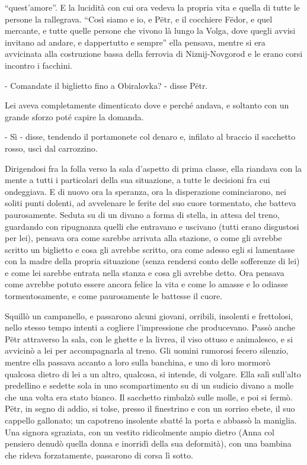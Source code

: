 ``quest'amore''. E la lucidità con cui ora vedeva la propria vita e quella di tutte le persone la rallegrava. ``Così siamo e io, e Pëtr, e il cocchiere Fëdor, e quel mercante, e tutte quelle persone che vivono là lungo la Volga, dove quegli avvisi invitano ad andare, e dappertutto e sempre'' ella pensava, mentre si era avvicinata alla costruzione bassa della ferrovia di Niznij-Novgorod e le erano corsi incontro i facchini. 

- Comandate il biglietto fino a Obiralovka? - disse Pëtr. 

Lei aveva completamente dimenticato dove e perché andava, e soltanto con un grande sforzo poté capire la domanda. 

- Sì - disse, tendendo il portamonete col denaro e, infilato al braccio il sacchetto rosso, uscì dal carrozzino. 

Dirigendosi fra la folla verso la sala d'aspetto di prima classe, ella riandava con la mente a tutti i particolari della sua situazione, a tutte le decisioni fra cui ondeggiava. E di nuovo ora la speranza, ora la disperazione cominciarono, nei soliti punti dolenti, ad avvelenare le ferite del suo cuore tormentato, che batteva paurosamente. Seduta su di un divano a forma di stella, in attesa del treno, guardando con ripugnanza quelli che entravano e uscivano (tutti erano disgustosi per lei), pensava ora come sarebbe arrivata alla stazione, o come gli avrebbe scritto un biglietto e cosa gli avrebbe scritto, ora come adesso egli si lamentasse con la madre della propria situazione (senza rendersi conto delle sofferenze di lei) e come lei sarebbe entrata nella stanza e cosa gli avrebbe detto. Ora pensava come avrebbe potuto essere ancora felice la vita e come lo amasse e lo odiasse tormentosamente, e come paurosamente le battesse il cuore. 

Squillò un campanello, e passarono alcuni giovani, orribili, insolenti e frettolosi, nello stesso tempo intenti a cogliere l'impressione che producevano. Passò anche Pëtr attraverso la sala, con le ghette e la livrea, il viso ottuso e animalesco, e si avvicinò a lei per accompagnarla al treno. Gli uomini rumorosi fecero silenzio, mentre ella passava accanto a loro sulla banchina, e uno di loro mormorò qualcosa dietro di lei a un altro, qualcosa, si intende, di volgare. Ella salì sull'alto predellino e sedette sola in uno scompartimento su di un sudicio divano a molle che una volta era stato bianco. Il sacchetto rimbalzò sulle molle, e poi si fermò. Pëtr, in segno di addio, si tolse, presso il finestrino e con un sorriso ebete, il suo cappello gallonato; un capotreno insolente sbatté la porta e abbassò la maniglia. Una signora sgraziata, con un vestito ridicolmente ampio dietro (Anna col pensiero denudò quella donna e inorridì della sua deformità), con una bambina che rideva forzatamente, passarono di corsa lì sotto. 

